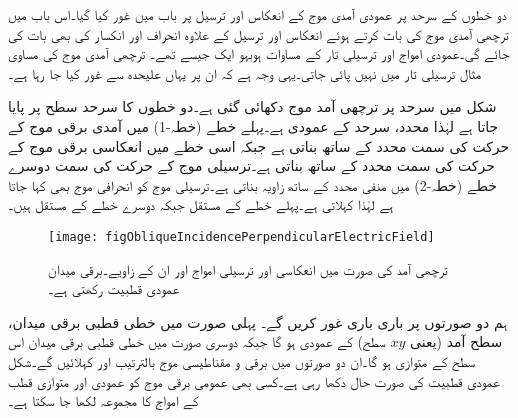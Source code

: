 دو خطوں کے سرحد پر عمودی آمدی موج کے انعکاس اور ترسیل پر باب  میں غور کیا گیا۔اس باب میں ترچھی آمدی موج کی بات کرتے ہوئے انعکاس اور ترسیل کے علاوہ انحراف اور انکسار کی بھی بات کی جائے گی۔عمودی امواج اور ترسیلی تار کے مساوات ہوبہو ایک جیسے تھے۔ ترچھی آمدی موج کی مساوی مثال ترسیلی تار میں نہیں پائی جاتی۔یہی وجہ ہے کہ ان پر یہاں علیحدہ  سے غور کیا جا رہا ہے۔

شکل  میں سرحد پر ترچھی آمد موج دکھائی گئی ہے۔دو خطوں کا سرحد  سطح پر پایا جاتا ہے لہٰذا  محدد، سرحد کے عمودی ہے۔پہلے خطے (خطہ-1) میں آمدی برقی موج کے حرکت کی سمت  محدد کے ساتھ   بناتی ہے جبکہ اسی خطے میں انعکاسی برقی موج کے حرکت کی سمت   محدد کے ساتھ   بناتی ہے۔ترسیلی موج کے حرکت کی سمت  دوسرے خطے (خطہ-2) میں منفی  محدد کے ساتھ  زاویہ بناتی ہے۔ترسیلی موج کو انحرافی موج بھی کہا جاتا ہے لہٰذا   کہلاتی ہے۔پہلے خطے کے مستقل  جبکہ دوسرے خطے کے مستقل  ہیں۔
\begin{figure}
\centering
\texttt{[image: figObliqueIncidencePerpendicularElectricField]}
\caption{ترچھی آمد کی صورت میں انعکاسی اور ترسیلی امواج اور ان کے زاویے۔برقی میدان عمودی قطبیت رکھتی ہے۔}
\label{شکل_ترچھی_آمد_متوازی_برقی_میدان_عمومی_شکل}
\end{figure}

ہم دو صورتوں پر باری باری غور کریں گے۔ پہلی صورت میں خطی قطبی برقی میدان، سطح آمد (یعنی $xy$ سطح) کے  عمودی ہو گا جبکہ دوسری صورت میں خطی قطبی برقی میدان اس سطح کے متوازی ہو گا۔ان دو صورتوں میں برقی و مقناطیسی موج بالترتیب  اور  کہلائیں گے۔شکل  عمودی قطبیت کی صورت حال دکھا رہی ہے۔کسی بھی عمومی برقی موج کو عمودی اور متوازی قطب کے امواج کا مجموعہ لکھا جا سکتا ہے۔

